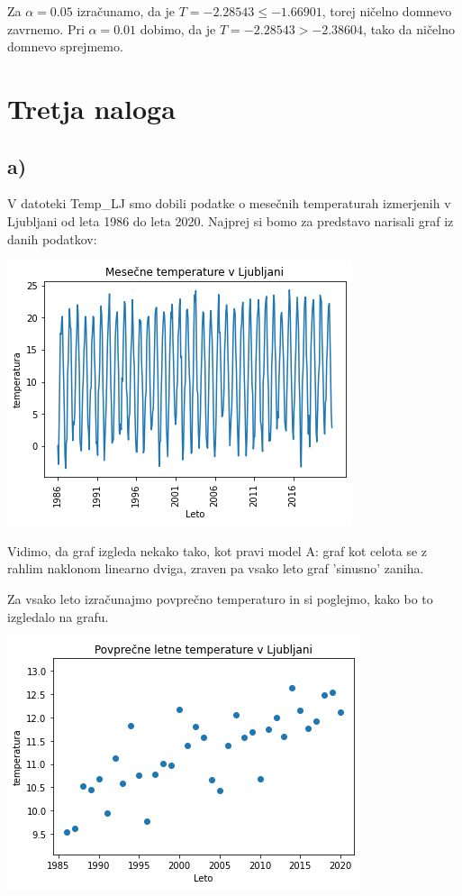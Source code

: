 \documentclass[12pt, a4paper]{article}
\begin{document}
Za $\alpha = 0.05$ izračunamo, da je $T = -2.28543 \leq -1.66901$, torej ničelno domnevo 
zavrnemo. Pri $\alpha = 0.01$ dobimo, da je $T = -2.28543 > -2.38604$, tako da 
ničelno domnevo sprejmemo. 


\section*{Tretja naloga}

\subsection*{a)}

V datoteki Temp\_LJ smo dobili podatke o mesečnih temperaturah izmerjenih
v Ljubljani od leta 1986 do leta 2020. Najprej si bomo za predstavo narisali 
graf iz danih podatkov:

\begin{center}
    \includegraphics[scale=0.7]{Naloga_3_01}
\end{center}

Vidimo, da graf izgleda nekako tako, kot pravi model A: graf kot celota se z
rahlim naklonom linearno dviga, zraven pa vsako leto graf 'sinusno' zaniha.

Za vsako leto izračunajmo povprečno temperaturo in si poglejmo, kako bo to 
izgledalo na grafu.

\begin{center}
    \includegraphics[scale=0.7]{Naloga_3_02}
\end{center}
\end{document}
